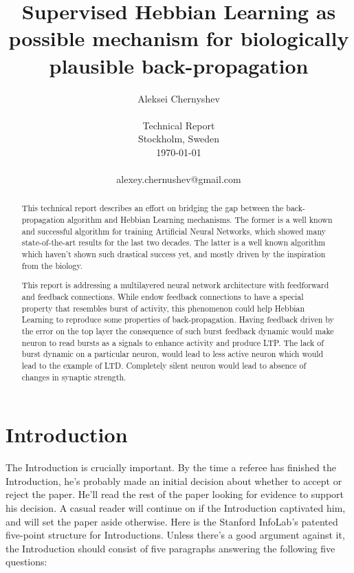 \documentclass[10pt,twocolumn]{article}
\begin{document}
\title{Supervised Hebbian Learning as possible mechanism for biologically plausible back-propagation}

\author{Aleksei Chernyshev \\
\\
Technical Report \\
Stockholm, Sweden \\
\today
\\
\\
alexey.chernushev@gmail.com  \\
}

\maketitle
\thispagestyle{empty}

\begin{abstract}
This technical report describes an effort on bridging the gap between the back-propagation algorithm and Hebbian Learning mechanisms. The former is a well known and successful algorithm for training Artificial Neural Networks, which showed many state-of-the-art results for the last two decades. The latter is a well known algorithm which haven't shown such drastical success yet, and mostly driven by the inspiration from the biology. 

This report is addressing a multilayered neural network architecture with feedforward and feedback connections. While endow feedback connections to have a special property that resembles burst of activity, this phenomenon could help Hebbian Learning to reproduce some properties of back-propagation. Having feedback driven by the error on the top layer the consequence of such burst feedback dynamic would make neuron to read bursts as a signals to enhance activity and produce LTP. The lack of burst dynamic on a particular neuron, would lead to less active neuron which would lead to the example of LTD. Completely silent neuron would lead to absence of changes in synaptic strength. \end{abstract}


\section{Introduction}
The Introduction is crucially important. By the time a referee has finished the Introduction, he's probably made an initial decision about whether to accept or reject the paper. He'll read the rest of the paper looking for evidence to support his decision. A casual reader will continue on if the Introduction captivated him, and will set the paper aside otherwise. 
Here is the Stanford InfoLab's patented five-point structure for Introductions. Unless there's a good argument against it, the Introduction should consist of five paragraphs answering the following five questions:
\end{document}
